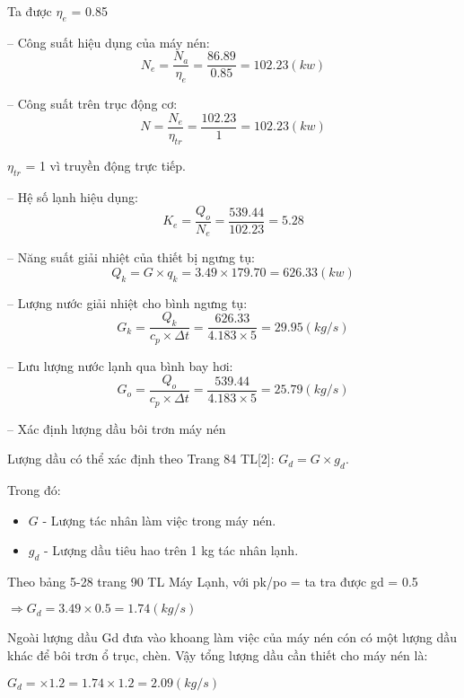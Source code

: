 Ta được $\eta_{e}$ = 0.85

-- Công suất hiệu dụng của máy nén:
\begin{equation*}
	N_{e} = \dfrac{N_{a}}{\eta_{e}} = \dfrac{86.89}{0.85} = 102.23(kw)
\end{equation*}

-- Công suất trên trục động cơ:
\begin{equation*}
	N = \dfrac{N_{e}}{\eta_{tr}} = \dfrac{102.23}{1} = 102.23(kw)
\end{equation*}

$ \eta_{tr} $ = 1 vì truyền động trực tiếp. 

-- Hệ số lạnh hiệu dụng:
\begin{equation*}
	K_{e} = \dfrac{Q_{o}}{N_{e}} = \dfrac{539.44}{102.23} = 5.28
\end{equation*}

-- Năng suất giải nhiệt của thiết bị ngưng tụ:
\begin{equation*}
	Q_{k} = G\times q_{k} = 3.49 \times 179.70 = 626.33(kw)
\end{equation*}

-- Lượng nước giải nhiệt cho bình ngưng tụ:
\begin{equation*}
	G_{k} = \dfrac{Q_{k}}{c_{p}\times \Delta t} = \dfrac{626.33}{4.183\times 5} = 29.95(kg/s)
\end{equation*}

-- Lưu lượng nước lạnh qua bình bay hơi:
\begin{equation*}
	G_{o} = \dfrac{Q_{o}}{c_{p}\times \Delta t} = \dfrac{539.44}{4.183 \times 5} = 25.79(kg/s)
\end{equation*}

-- Xác định lượng dầu bôi trơn máy nén

Lượng dầu có thể xác định theo Trang 84 TL[2]: $G_{d} = G\times g_{d}$.

Trong đó:
\begin{itemize}
	\item $G$ - Lượng tác nhân làm việc trong máy nén.
	\item $g_{d}$ - Lượng dầu tiêu hao trên 1 kg tác nhân lạnh.
\end{itemize}

Theo bảng 5-28 trang 90 TL Máy Lạnh, với pk/po =  ta tra được gd = 0.5

$\Rightarrow G_{d} = 3.49 \times 0.5 = 1.74(kg/s)$

Ngoài lượng dầu Gd đưa vào khoang làm việc của máy nén cón có một lượng dầu khác để bôi trơn ổ trục, chèn. Vậy tổng lượng dầu cần thiết cho máy nén là:

$G_{d} = \times 1.2 = 1.74 \times 1.2 = 2.09(kg/s)$
